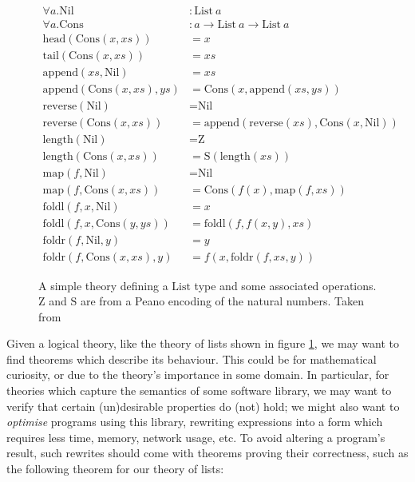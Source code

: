 \begin{figure}
  \begin{equation*}
    \begin{split}
      \forall a. \text{Nil} &: \text{List} \  a \\
      \forall a. \text{Cons} &: a \rightarrow \text{List} \  a \rightarrow \text{List} \ a \\
      \text{head}(\text{Cons}(x, xs)) &= x \\
      \text{tail}(\text{Cons}(x, xs)) &= xs \\
      \text{append}(xs, \text{Nil}) &= xs \\
      \text{append}(\text{Cons}(x, xs), ys) &= \text{Cons}(x, \text{append}(xs, ys)) \\
      \text{reverse}(\text{Nil}) &= \text{Nil} \\
      \text{reverse}(\text{Cons}(x, xs)) &= \text{append}(\text{reverse}(xs), \text{Cons}(x, \text{Nil})) \\
      \text{length}(\text{Nil}) &= \text{Z} \\
      \text{length}(\text{Cons}(x, xs)) &= \text{S} (\text{length}(xs)) \\
      \text{map}(f, \text{Nil}) &= \text{Nil} \\
      \text{map}(f, \text{Cons}(x, xs)) &= \text{Cons}(f(x), \text{map}(f, xs)) \\
      \text{foldl}(f, x, \text{Nil}) &= x \\
      \text{foldl}(f, x, \text{Cons}(y, ys)) &= \text{foldl}(f, f(x, y), xs) \\
      \text{foldr}(f, \text{Nil}, y) &= y \\
      \text{foldr}(f, \text{Cons}(x, xs), y) &= f(x, \text{foldr}(f, xs, y))
    \end{split}
  \end{equation*}
  \caption{A simple theory defining a $\text{List}$ type and some associated
    operations. $\text{Z}$ and $\text{S}$ are from a Peano encoding of the natural numbers.
    Taken from \cite{Johansson.Dixon.Bundy:conjecture-generation}}
  \label{figure:list_theory}
\end{figure}

Given a logical theory, like the theory of lists shown in figure
\ref{figure:list_theory}, we may want to find theorems which describe its
behaviour. This could be for mathematical curiosity, or due to the theory's
importance in some domain. In particular, for theories which capture the
semantics of some software library, we may want to verify that certain
(un)desirable properties do (not) hold; we might also want to \emph{optimise}
programs using this library, rewriting expressions into a form which requires
less time, memory, network usage, etc. To avoid altering a program's result,
such rewrites should come with theorems proving their correctness, such as the
following theorem for our theory of lists:

